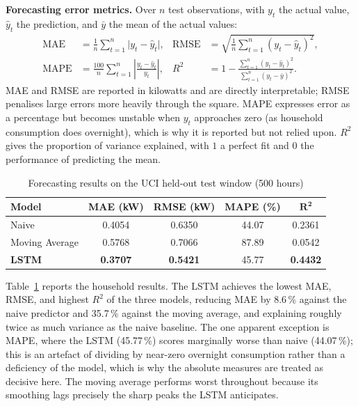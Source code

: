 \documentclass[11pt,a4paper]{article}
\begin{document}
\noindent\textbf{Forecasting error metrics.} Over $n$ test
observations, with $y_t$ the actual value, $\hat{y}_t$ the prediction, and
$\bar{y}$ the mean of the actual values:
\begin{align}
\mathrm{MAE} &= \frac{1}{n}\sum_{t=1}^{n}\lvert y_t-\hat{y}_t\rvert, &
\mathrm{RMSE} &= \sqrt{\frac{1}{n}\sum_{t=1}^{n}(y_t-\hat{y}_t)^2},\\
\mathrm{MAPE} &= \frac{100}{n}\sum_{t=1}^{n}\left\lvert\frac{y_t-\hat{y}_t}{y_t}\right\rvert, &
R^2 &= 1-\frac{\sum_{t=1}^{n}(y_t-\hat{y}_t)^2}{\sum_{t=1}^{n}(y_t-\bar{y})^2}.
\end{align}
MAE and RMSE are reported in kilowatts and are directly interpretable; RMSE
penalises large errors more heavily through the square. MAPE expresses error as a
percentage but becomes unstable when $y_t$ approaches zero (as household
consumption does overnight), which is why it is reported but not relied upon.
$R^2$ gives the proportion of variance explained, with $1$ a perfect fit and $0$
the performance of predicting the mean.


\begin{table}[htbp]
\centering
\caption{Forecasting results on the UCI held-out test window (500 hours)}
\label{tab:uci}
\small
\renewcommand{\arraystretch}{1.3}
\begin{tabular}{|l|c|c|c|c|}
\hline
\textbf{Model} & \textbf{MAE (kW)} & \textbf{RMSE (kW)} & \textbf{MAPE (\%)} & $\mathbf{R^2}$\\ \hline
Naive & 0.4054 & 0.6350 & 44.07 & 0.2361\\ \hline
Moving Average & 0.5768 & 0.7066 & 87.89 & 0.0542\\ \hline
\textbf{LSTM} & \textbf{0.3707} & \textbf{0.5421} & 45.77 & \textbf{0.4432}\\ \hline
\end{tabular}
\end{table}

Table~\ref{tab:uci} reports the household results. The LSTM achieves the lowest MAE, RMSE, and highest $R^2$ of the three models, reducing MAE by 8.6\,\% against the naive predictor and 35.7\,\% against the moving average, and explaining roughly twice as much variance as the naive baseline. The one apparent exception is MAPE, where the LSTM (45.77\,\%) scores marginally worse than naive (44.07\,\%); this is an artefact of dividing by near-zero overnight consumption rather than a deficiency of the model, which is why the absolute measures are treated as decisive here. The moving average performs worst throughout because its smoothing lags precisely the sharp peaks the LSTM anticipates.
\end{document}
